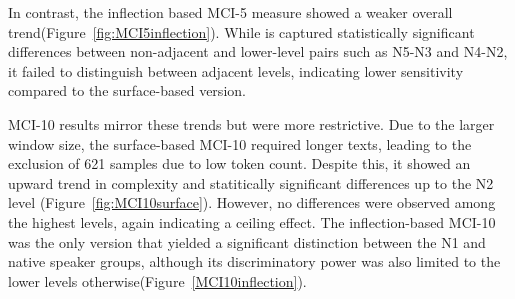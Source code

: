 
In contrast, the inflection based MCI-5 measure showed a weaker overall trend(Figure~\ref{fig:MCI5inflection}).
While is captured
statistically
significant differences between non-adjacent and lower-level pairs such as N5-N3 and N4-N2, it failed to distinguish
between adjacent levels, indicating lower sensitivity compared to the surface-based version.



MCI-10 results mirror these trends but were more restrictive. Due to the larger window size, the surface-based MCI-10
required longer texts, leading to the exclusion of 621 samples due to low token count.  Despite this, it showed an
upward trend in complexity and statitically significant differences up to the N2 level (Figure~\ref{fig:MCI10surface}). However, no
differences were
observed among the highest levels, again indicating a ceiling effect. The inflection-based MCI-10 was the only
version that yielded a significant distinction between the N1 and native speaker groups, although its discriminatory
power was also limited to the lower levels otherwise(Figure~\ref{MCI10inflection}).


